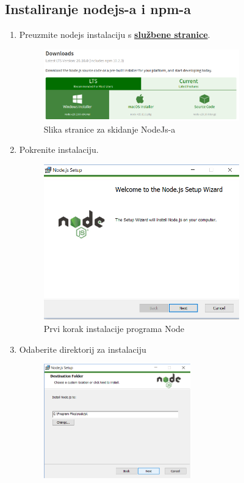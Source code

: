 		\subsection*{Instaliranje nodejs-a i npm-a}
		\begin{enumerate}
			\item Preuzmite nodejs instalaciju s \textbf{\href{https://nodejs.org/en/download/}{službene stranice}}.
			\begin{figure}[h]
				\centering
				\includegraphics[width=0.8\textwidth]{slike/npm_install/0.png}
				\caption{Slika stranice za skidanje NodeJs-a}
				\label{fig:node_install_images}
			\end{figure}
			\item Pokrenite instalaciju.
			\begin{figure}[h]
				\centering
				\includegraphics[width=0.8\textwidth]{slike/npm_install/1.png}
				\caption{Prvi korak instalacije programa Node}
				\label{fig:node_install_images}
			\end{figure}
			\eject
			\item Odaberite direktorij za instalaciju
			\begin{figure}[h]
				\centering
				\includegraphics[width=0.6\textwidth]{slike/npm_install/2.png}

\end{figure}
\end{enumerate}
